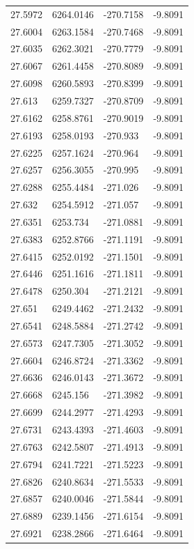 \begin{table}[H]
\begin{tabular}{llll}
27.5972 & 6264.0146 & -270.7158 & -9.8091 \\
27.6004 & 6263.1584 & -270.7468 & -9.8091 \\
27.6035 & 6262.3021 & -270.7779 & -9.8091 \\
27.6067 & 6261.4458 & -270.8089 & -9.8091 \\
27.6098 & 6260.5893 & -270.8399 & -9.8091 \\
27.613 & 6259.7327 & -270.8709 & -9.8091 \\
27.6162 & 6258.8761 & -270.9019 & -9.8091 \\
27.6193 & 6258.0193 & -270.933 & -9.8091 \\
27.6225 & 6257.1624 & -270.964 & -9.8091 \\
27.6257 & 6256.3055 & -270.995 & -9.8091 \\
27.6288 & 6255.4484 & -271.026 & -9.8091 \\
27.632 & 6254.5912 & -271.057 & -9.8091 \\
27.6351 & 6253.734 & -271.0881 & -9.8091 \\
27.6383 & 6252.8766 & -271.1191 & -9.8091 \\
27.6415 & 6252.0192 & -271.1501 & -9.8091 \\
27.6446 & 6251.1616 & -271.1811 & -9.8091 \\
27.6478 & 6250.304 & -271.2121 & -9.8091 \\
27.651 & 6249.4462 & -271.2432 & -9.8091 \\
27.6541 & 6248.5884 & -271.2742 & -9.8091 \\
27.6573 & 6247.7305 & -271.3052 & -9.8091 \\
27.6604 & 6246.8724 & -271.3362 & -9.8091 \\
27.6636 & 6246.0143 & -271.3672 & -9.8091 \\
27.6668 & 6245.156 & -271.3982 & -9.8091 \\
27.6699 & 6244.2977 & -271.4293 & -9.8091 \\
27.6731 & 6243.4393 & -271.4603 & -9.8091 \\
27.6763 & 6242.5807 & -271.4913 & -9.8091 \\
27.6794 & 6241.7221 & -271.5223 & -9.8091 \\
27.6826 & 6240.8634 & -271.5533 & -9.8091 \\
27.6857 & 6240.0046 & -271.5844 & -9.8091 \\
27.6889 & 6239.1456 & -271.6154 & -9.8091 \\
27.6921 & 6238.2866 & -271.6464 & -9.8091 \\

\end{tabular}
\end{table}
